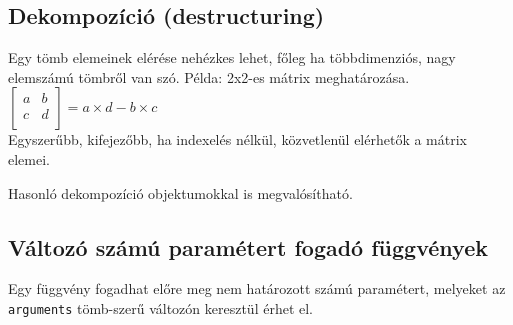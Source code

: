 \subsection{Dekompozíció (destructuring)}

\begin{frame}
  Egy tömb elemeinek elérése nehézkes lehet, főleg ha többdimenziós, nagy elemszámú tömbről van szó. Példa: 2x2-es mátrix  meghatározása.\\
  $\left[ \begin{array}{cc} a & b \\ c & d \\ \end{array} \right] = a\times d - b\times c$ \\
  Egyszerűbb, kifejezőbb, ha indexelés nélkül, közvetlenül elérhetők a mátrix elemei.
  \footnotesize
  \begin{exampleblock}{}
    
  \end{exampleblock}
\end{frame}

\begin{frame}
  Hasonló dekompozíció objektumokkal is megvalósítható.
  \footnotesize
  \begin{exampleblock}{}
    
  \end{exampleblock}
\end{frame}

\subsection{Változó számú paramétert fogadó függvények}

\begin{frame}
  Egy függvény fogadhat előre meg nem határozott számú paramétert, melyeket az \texttt{arguments} tömb-szerű változón keresztül érhet el.
  \begin{exampleblock}{}
    
  \end{exampleblock}
\end{frame}


